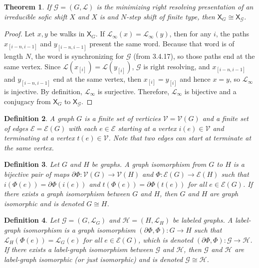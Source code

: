 \documentclass{article}
\newcommand{\Lc}{\mathcal{L}}  %
\newcommand{\Gc}{\mathcal{G}}  %
\newcommand{\Hc}{\mathcal{H}}  %
\newcommand{\Vc}{\mathcal{V}}
\newcommand{\Ec}{\mathcal{E}}
\newcommand{\shift}[1]{\mathsf{X}_{#1}}
\newcommand{\term}[1]{\textit{#1}}
\newtheorem{theorem}{Theorem}
\newtheorem{definition}[theorem]{Definition}
\begin{document}
    \begin{theorem}
        If \(\mathcal{G} = (G, \mathcal{L})\) is the minimizing right resolving
        presentation of an irreducible sofic shift \(X\) and \(X\) is and
        \(N\)-step shift of finite type, then \(\shift{G} \cong \shift{\Gc}\).
    \end{theorem}
    
    \begin{proof}
        Let \(x, y\) be walks in \(\shift{G}\). If \(\mathcal{L}_\infty(x)=\mathcal{L}_\infty(y)\),
        then for any \(i\), the paths \(x_{[i-n, i-1]}\) and \(y_{[i-n, i-1]}\) present 
        the same word. Because that word is of length \(N\), the word is synchronizing
        for \(\mathcal{G}\) (from 3.4.17), so those paths end at the same vertex. Since
        \(\mathcal{L}(x_{[i]}) = \mathcal{L}(y_{[i]})\), \(\mathcal{G}\) is right 
        resolving, and \(x_{[i-n, i-1]}\) and \(y_{[i-n, i-1]}\) end at the same vertex,
        then \(x_{[i]} = y_{[i]}\) and hence \(x = y\), so \(\mathcal{L}_\infty\) is injective.
        By definition, \(\mathcal{L}_\infty\) is surjective. Therefore, \(\mathcal{L}_\infty\) is bijective and 
        a conjugacy from \(\mathsf{X}_G\) to \(\mathsf{X}_\mathcal{G}\).
    \end{proof}

    \begin{definition}
        A \term{graph} \(G\) is a finite set of \term{verticies} \(\Vc=\Vc(G)\) and a finite set 
        of edges \(\Ec = \Ec(G)\) with each \(e \in \Ec\) starting at a vertex \(i(e) \in \Vc\)
        and terminating at a vertex \(t(e) \in \Vc\). Note that two edges can start at terminate
        at the same vertex.
    \end{definition}

    \begin{definition}
        Let \(G\) and \(H\) be graphs. A \term{graph isomorphism from \(G\) to \(H\)}
        is a bijective pair of maps \(\partial \Phi : \Vc(G) \to \Vc(H)\) and \(\Phi : \Ec(G) \to \Ec(H)\)
        such that \(i(\Phi(e)) = \partial \Phi(i(e))\) and \(t(\Phi(e)) = \partial \Phi(t(e))\)
        for all \(e \in \Ec(G)\). If there exists a graph isomorphism between \(G\) and \(H\),
        then \(G\) and \(H\) are graph isomorphic and is denoted \(G \cong H\).
    \end{definition}

    \begin{definition}
        Let \(\Gc = (G, \Lc_G)\) and \(\Hc = (H, \Lc_H)\) be labeled graphs.
        A label-graph isomorphism is a graph isomorphism \((\partial \Phi, \Phi) : G \to H\)
        such that \(\Lc_H(\Phi(e)) = \Lc_G(e)\) for all \(e \in \Ec(G)\), which is 
        denoted \((\partial \Phi, \Phi) : \Gc \to \Hc\). If there exists a label-graph 
        isomorphism between \(\Gc\) and \(\Hc\), then \(\Gc\) and \(\Hc\) are label-graph
        isomorphic (or just isomorphic) and is denoted \(\Gc \cong \Hc\).
    \end{definition}
\end{document}
